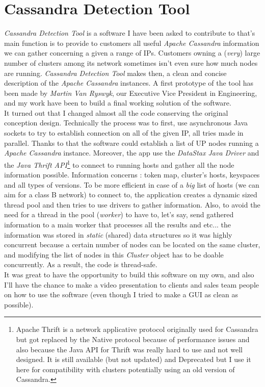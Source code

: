 \documentclass[a4paper]{report}
\newcommand{\djd}{\emph{DataStax Java Driver }}
\newcommand{\ca}{\emph{Apache Cassandra }}
\begin{document}
\section{Cassandra Detection Tool}
\emph{Cassandra Detection Tool} is a software I have been asked to contribute to that's main function is to provide to customers all useful \ca information we can gather concerning a given a range of IPs. Customers owning a (\emph{very}) large number of clusters among its network sometimes isn't even sure how much nodes are running. \emph{Cassandra Detection Tool} makes then, a clean and concise description of the \ca instances. 
A first prototype of the tool has been made by \emph{Martin Van Ryswyk}, our Executive Vice President in Engineering, and my work have been to build a final working solution of the software.\\
It turned out that I changed almost all the code conserving the original conception design. Technically the process was to first, use asynchronous Java sockets to try to establish connection on all of the given IP, all tries made in parallel. Thanks to that the software could establish a list of UP nodes running a \ca instance. Moreover, the app use the \djd and  the \emph{Java Thrift API}\footnote{Apache Thrift is a network applicative protocol originally used for Cassandra but got replaced by the Native protocol because of performance issues and also because the Java API for Thrift was really hard to use and not well designed. It is still available (but not updated) and Deprecated but I use it here for compatibility with clusters potentially using an old version of Cassandra.}
to connect to running hosts and gather all the node information possible. Information concerns : token map, cluster's hosts, keyspaces and all types of versions. To be more efficient in case of a \emph{big} list of hosts (we can aim for a class B network) to connect to, the application creates a dynamic sized thread pool and then tries to use drivers to gather information. Also, to avoid the need for a thread in the pool (\emph{worker}) to have to, let's say, send gathered information to a main worker that processes all the results and etc... the information was stored in \emph{static} (shared) data structures so it was highly concurrent because a certain number of nodes can be located on the same cluster, and modifying the list of nodes in this \emph{Cluster} object has to be doable concurrently. As a result, the code is thread-safe.\\
It was great to have the opportunity to build this software on my own, and also I'll have the chance to make a video presentation to clients and sales team people on how to use the software (even though I tried to make a GUI as clean as possible).
\end{document}
